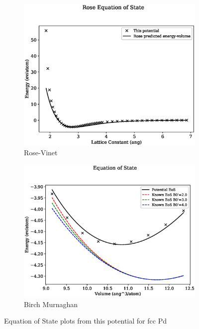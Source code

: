 \begin{figure}[htb]
\begin{subfigure}{.44\textwidth}
  \centering
  \includegraphics[width=.94\linewidth]{chapters/potentials_fe_pd_ru/fepd_potential/eos/rose_plot_bp_0.eps}  
  \caption{Rose-Vinet}
  \label{fig:fepd-fefcc-rose}
\end{subfigure}
\begin{subfigure}{.44\textwidth}
  \centering
  \includegraphics[width=.94\linewidth]{chapters/potentials_fe_pd_ru/fepd_potential/eos/equation_of_state_bp_0.eps}  
  \caption{Birch Murnaghan}
  \label{fig:fepd-fefcc-bmeos}
\end{subfigure}
\label{fig:fepd-fefcc-equation-of-state}
\caption{Equation of State plots from this potential for \acrshort{fcc} Pd}
\end{figure}


